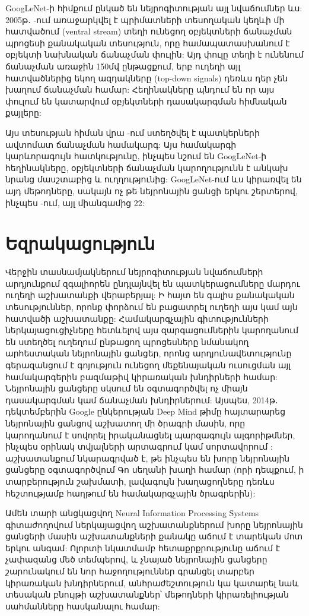 \documentclass[12pt,final]{amsproc}
\begin{document}
 
GoogLeNet-ի հիմքում ընկած են նեյրոգիտության այլ նվաճումներ ևս: 2005թ․ \cite{Serre2005}-ում առաջարկվել է պրիմատների տեսողական կեղևի մի հատվածում (ventral stream) տեղի ունեցող օբյեկտների ճանաչման պրոցեսի քանակական տեսություն, որը համապատասխանում է օբյեկտի նախնական ճանաչման փուլին: Այդ փուլը տեղի է ունենում ճանաչման առաջին 150մվ ընթացքում, երբ ուղեղի այլ հատվածներից եկող ազդակները (top-down signals) դեռևս դեր չեն խաղում ճանաչման համար: Հեղինակները պնդում են որ այս փուլում են կատարվում օբյեկտների դասակարգման հիմնական քայլերը: 

Այս տեսության հիման վրա \cite{Serre2007}-ում ստեղծվել է պատկերների ավտոմատ ճանաչման համակարգ: Այս համակարգի կարևորագույն հատկությունը, ինչպես նշում են GoogLeNet-ի հեղինակները, օբյեկտների ճանաչման կարողությունն է անկախ նրանց մասշտաբից և ուղղությունից: GoogLeNet-ում ևս կիրառվել են այդ մեթոդները, սակայն ոչ թե նեյրոնային ցանցի երկու շերտերով, ինչպես \cite{Serre2007}-ում, այլ միանգամից 22: 

\section*{Եզրակացություն}
Վերջին տասնամյակներում նեյրոգիտության նվաճումների արդյունքում զգալիորեն ընդլայնվել են պատկերացումները մարդու ուղեղի աշխատանքի վերաբերյալ: Ի հայտ են գալիս քանակական տեսություններ, որոնք փորձում են բացատրել ուղեղի այս կամ այն հատվածի աշխատանքը: Համակարգչային գիտությունների ներկայացուցիչները հետևելով այս զարգացումներին կարողանում են ստեղծել ուղեղում ընթացող պրոցեսները նմանակող արհեստական նեյրոնային ցանցեր, որոնց արդյունավետությունը գերազանցում է գոյություն ունեցող մեքենայական ուսուցման այլ համակարգերին բազմաթիվ կիրառական խնդիրների համար: Նեյրոնային ցանցերը սկսում են օգտագործվել ոչ միայն դասակարգման կամ ճանաչման խնդիրներում: Այսպես, 2014թ․ դեկտեմբերին Google ընկերության Deep Mind թիմը հայտարարեց նեյրոնային ցանցով աշխատող մի ծրագրի մասին, որը կարողանում է սովորել իրականացնել պարզագույն ալգորիթմներ, ինչպես օրինակ տվյալների արտագրում կամ սորտավորում \cite{NTM}: \cite{Go} աշխատանքում նկարագրված է, թե ինչպես են խորը նեյրոնային ցանցերը օգտագործվում Գո սեղանի խաղի համար (որի դեպքում, ի տարբերություն շախմատի, լավագույն խաղացողները դեռևս հեշտությամբ հաղթում են համակարգչային ծրագրերին): 

Ամեն տարի անցկացվող Neural Information Processing Systems գիտաժողովում ներկայացվող աշխատանքներում խորը նեյրոնային ցանցերի մասին աշխատանքների քանակը աճում է տարեկան մոտ երկու անգամ: Ոլորտի նկատմամբ հետաքրքրությունը աճում է չափազանց մեծ տեմպերով, և չնայած նեյրոնային ցանցերը շարունակում են նոր հաջողություններ գրանցել տարբեր կիրառական խնդիրներում, անհրաժեշտություն կա կատարել նաև տեսական բնույթի աշխատանքներ՝ մեթոդների կիրառելիության սահմանները հասկանալու համար:

\printbibliography[title={Գրականություն}]
\end{document}

